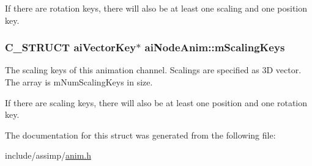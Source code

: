 \-If there are rotation keys, there will also be at least one scaling and one position key. \hypertarget{structaiNodeAnim_a4588122722d5148d6e590da820bdf35f}{
\subsubsection[{m\-Scaling\-Keys}]{\setlength{\rightskip}{0pt plus 5cm}\-C\-\_\-\-S\-T\-R\-U\-C\-T {\bf ai\-Vector\-Key}$\ast$ {\bf ai\-Node\-Anim\-::m\-Scaling\-Keys}}}\label{structaiNodeAnim_a4588122722d5148d6e590da820bdf35f}
\-The scaling keys of this animation channel. \-Scalings are specified as 3\-D vector. \-The array is m\-Num\-Scaling\-Keys in size.

\-If there are scaling keys, there will also be at least one position and one rotation key. 

\-The documentation for this struct was generated from the following file\-:\begin{DoxyCompactItemize}
\item 
include/assimp/\hyperlink{anim_8h}{anim.\-h}\end{DoxyCompactItemize}
